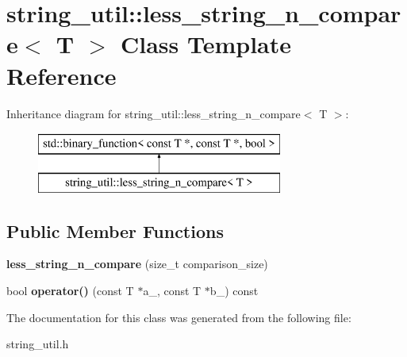 \hypertarget{classstring__util_1_1less__string__n__compare}{\section{string\+\_\+util\+:\+:less\+\_\+string\+\_\+n\+\_\+compare$<$ T $>$ Class Template Reference}
\label{classstring__util_1_1less__string__n__compare}
}
Inheritance diagram for string\+\_\+util\+:\+:less\+\_\+string\+\_\+n\+\_\+compare$<$ T $>$\+:\begin{figure}[H]
\begin{center}
\leavevmode
\includegraphics[height=2.000000cm]{classstring__util_1_1less__string__n__compare}
\end{center}
\end{figure}
\subsection*{Public Member Functions}
\begin{DoxyCompactItemize}
\item 
\hypertarget{classstring__util_1_1less__string__n__compare_a42b269c0aa27c5ace8b3eeb782f6d335}{{\bfseries less\+\_\+string\+\_\+n\+\_\+compare} (size\+\_\+t comparison\+\_\+size)}\label{classstring__util_1_1less__string__n__compare_a42b269c0aa27c5ace8b3eeb782f6d335}

\item 
\hypertarget{classstring__util_1_1less__string__n__compare_ab6f6bb1fbd6421cb848bba88ce18f6e0}{bool {\bfseries operator()} (const T $\ast$a\+\_\+, const T $\ast$b\+\_\+) const }\label{classstring__util_1_1less__string__n__compare_ab6f6bb1fbd6421cb848bba88ce18f6e0}

\end{DoxyCompactItemize}


The documentation for this class was generated from the following file\+:\begin{DoxyCompactItemize}
\item 
string\+\_\+util.\+h\end{DoxyCompactItemize}
